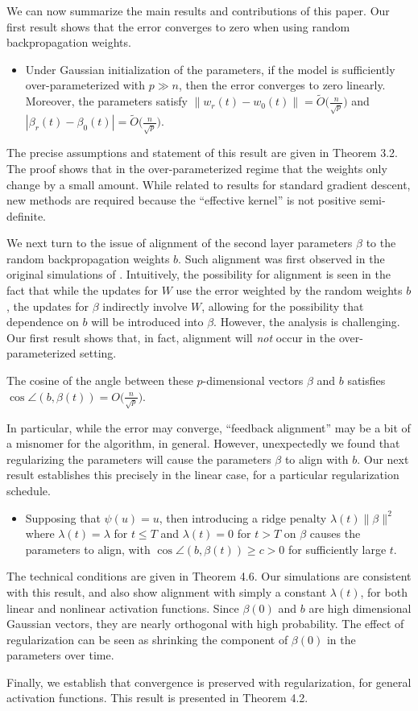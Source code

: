 We can now summarize the main results and contributions of this paper. Our first result shows that the error converges to zero when using random backpropagation weights.

\begin{itemize}
  \item Under Gaussian initialization of the parameters, if the model is sufficiently over-parameterized with $p\gg n$, then the error converges to zero linearly. Moreover, the parameters satisfy $\|w_r(t) - w_0(t) \| = \widetilde O\bigl(\frac{n}{\sqrt{p}}\bigr)$
    and $|\beta_r(t) - \beta_0(t) | = \widetilde O\bigl(\frac{n}{\sqrt{p}}\bigr)$.
\end{itemize}
The precise assumptions and statement of this result are given in Theorem 3.2. The proof
shows that in the over-parameterized regime that the weights only change
by a small amount. While related to results for standard gradient descent,
new methods are required because the ``effective kernel'' is not positive semi-definite.

We next turn to the issue of alignment of the second layer parameters $\beta$ to the random backpropagation weights $b$. Such alignment was first observed in the original simulations of \cite{lillicrap2016random}. Intuitively, the possibility for alignment is seen in the fact that while the updates for $W$ use the error weighted by the random weights $b$, the updates for $\beta$ indirectly involve $W$, allowing for the possibility that dependence on $b$ will be introduced into $\beta$. However, the analysis is challenging. Our first result shows that, in fact, alignment will \textit{not} occur in the over-parameterized setting.
\begin{itemize}
The cosine of the angle between
these $p$-dimensional vectors $\beta$ and $b$ satisfies $ \cos\angle(b, \beta(t)) = O\big(\frac{n}{\sqrt p}\big)$.
\end{itemize}
In particular, while the error may converge, ``feedback alignment'' may be a bit of a misnomer for the algorithm, in general. However, unexpectedly we found that regularizing the parameters will cause the parameters $\beta$ to align with $b$. Our next result establishes this precisely in the linear case, for a particular regularization schedule.
\begin{itemize}
\item Supposing that $\psi(u)=u$, then introducing a ridge penalty $\lambda(t) \|\beta\|^2$ where $\lambda(t) = \lambda$ for $t\leq T$ and $\lambda(t) = 0$ for $t > T$
on $\beta$  causes the parameters to align, with $\cos\angle(b, \beta(t)) \geq c > 0$ for sufficiently large $t$.
\end{itemize}
The technical conditions are given in Theorem 4.6.
Our simulations are consistent with this result, and also show alignment with simply a constant $\lambda(t)$, for both linear and nonlinear activation functions. Since $\beta(0)$ and $b$ are high dimensional Gaussian vectors, they are nearly orthogonal with high probability. The effect of regularization can be seen as shrinking the component of $\beta(0)$ in the parameters over time.

Finally, we establish that convergence is preserved with regularization, for general activation functions. This result is presented in Theorem 4.2.
